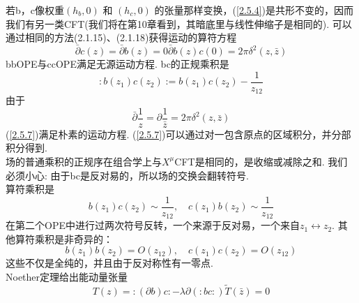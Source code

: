 若b，c像权重$\left(h_{b}, 0\right)$ 和 $\left(h_{c}, 0\right)$ 的张量那样变换，(\ref{2.5.4})是共形不变的，因而我们有另一类CFT(我们将在第10章看到，其暗底里与线性伸缩子是相同的). 可以通过相同的方法(2.1.15)、(2.1.18)获得运动的算符方程
\begin{subequations}
\begin{equation}
\bar{\partial} c(z)=\bar{\partial} b(z)=0
\end{equation}
\begin{equation}
\bar{\partial} b(z) c(0)=2 \pi \delta^{2}(z, \bar{z})
\end{equation}
\end{subequations}
bbOPE与ccOPE满足无源运动方程. bc的正规乘积是
\begin{equation}\label{2.5.7}
: b\left(z_{1}\right) c\left(z_{2}\right):=b\left(z_{1}\right) c\left(z_{2}\right)-\frac{1}{z_{12}}
\end{equation}
由于
\begin{equation}
\bar{\partial} \frac{1}{z}=\partial \frac{1}{\bar{z}}=2 \pi \delta^{2}(z, \bar{z})
\end{equation}
(\ref{2.5.7})满足朴素的运动方程. (\ref{2.5.7})可以通过对一包含原点的区域积分，并分部积分得到.\\
场的普通乘积的正规序在组合学上与$X^\mu$CFT是相同的，是收缩或减除之和. 我们必须小心: 由于bc是反对易的，所以场的交换会翻转符号.  \\
算符乘积是
\begin{equation}
b\left(z_{1}\right) c\left(z_{2}\right) \sim \frac{1}{z_{12}}, \quad c\left(z_{1}\right) b\left(z_{2}\right) \sim \frac{1}{z_{12}}
\end{equation}
在第二个OPE中进行过两次符号反转，一个来源于反对易，一个来自$z_{1} \longleftrightarrow z_{2}$. 其他算符乘积是非奇异的：
\begin{equation}
b\left(z_{1}\right) b\left(z_{2}\right)=O\left(z_{12}\right), \quad c\left(z_{1}\right) c\left(z_{2}\right)=O\left(z_{12}\right)
\end{equation}
这些不仅是全纯的，并且由于反对称性有一零点.\\
Noether定理给出能动量张量
\begin{subequations}\label{2.5.11}
\begin{equation}
T(z)=:(\partial b) c:-\lambda \partial(: b c:)
\end{equation}
\begin{equation}
\tilde{T}(\bar{z})=0
\end{equation}
\end{subequations}
